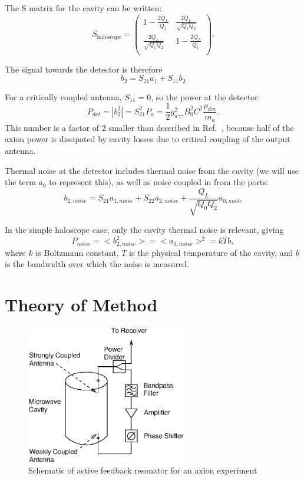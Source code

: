 \documentclass[aps,prl,twocolumn,groupedaddress]{revtex4-1}
\begin{document}
The S matrix for the cavity can be written:
\begin{equation}
S_{\mathrm{haloscope}}=
\left( \begin{array}{cc}
        1-\frac{2Q_L}{Q_1} & \frac{2Q_L}{\sqrt{Q_1Q_2}}\\
        \frac{2Q_L}{\sqrt{Q_1Q_2}} & 1-\frac{2Q_L}{Q_1} \\
		\end{array}\right).
\end{equation}

The signal towards the detector is therefore
\begin{equation}
b_2=S_{21}a_1+S_{11}b_2
\end{equation}

For a critically coupled antenna, $S_{11}=0$, so the power at the detector:
\begin{equation}
P_{det}=|b_2^2|=S_{21}^2 P_a =\frac{1}{2} g^2_{a\gamma\gamma}B_0^2C^2 \frac{\rho_{dm}}{m_a}.
\end{equation}
This number is a factor of 2 smaller than described in Ref.~\cite{sikivie}, because half of the axion power is dissipated by cavity losses due to critical coupling of the output antenna.

Thermal noise at the detector includes thermal noise from the cavity (we will use the term $a_0$ to represent this), as well as noise coupled in from the ports:
\begin{equation}
b_{2,noise}=S_{21} a_{1,noise}+S_{22} a_{2,noise} + \frac{Q_L}{\sqrt{Q_0Q_2}} a_{0,noise}
\end{equation}

In the simple haloscope case, only the cavity thermal noise is relevant, giving
\begin{equation}
P_{noise}=<b_{2,noise}^2>=<a_{0,noise}>^2=kTb,
\end{equation}
where $k$ is Boltzmann constant, $T$ is the physical temperature of the cavity, and $b$ is the bandwidth over which the noise is measured.

\section{Theory of Method}

\begin{figure}
\includegraphics[width=7cm]{figs/experiment_schematic.eps}
\caption{\label{fig:experiment_schematic} Schematic of active feedback resonator for an axion experiment}
\end{figure}
\end{document}
